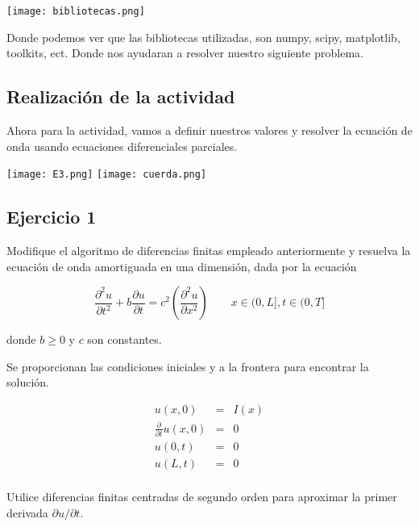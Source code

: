 \documentclass[12pt]{article}
\begin{document}
\begin{center}
    \texttt{[image: bibliotecas.png]}
\end{center}
 
 Donde podemos ver que las bibliotecas utilizadas, son numpy, scipy, matplotlib, toolkits, ect. Donde nos ayudaran a resolver nuestro siguiente problema.




\subsection*{Realización de la actividad}
Ahora para la actividad, vamos a definir nuestros valores y resolver la ecuación de onda usando ecuaciones diferenciales parciales.

\begin{center}
    \texttt{[image: E3.png]}
    \texttt{[image: cuerda.png]}
\end{center}

 



\subsection*{Ejercicio 1}

Modifique el algoritmo de diferencias finitas empleado anteriormente y resuelva la ecuación de onda amortiguada en una dimensión, dada por la ecuación

\begin{equation*}
\frac{\partial^2 u}{\partial t^2} + 
 b \frac{\partial u}{\partial t}
 = c^2 \left( 
  \frac{\partial^2 u}{\partial x^2}
   \right) \qquad x \in (0,L], t \in (0,T]
\end{equation*}

donde $b \ge 0 $ y $c$ son constantes. 

Se proporcionan las condiciones iniciales y a la frontera para encontrar la solución.

\begin{eqnarray*}
u(x,0) & = & I(x) \\
\frac{\partial}{\partial t} u(x,0) & = & 0 \\
u(0,t) & = & 0 \\
u(L,t) & = & 0 \\
\end{eqnarray*}

Utilice diferencias finitas centradas de segundo orden para aproximar la primer derivada $\partial u/\partial t$.
\end{document}
